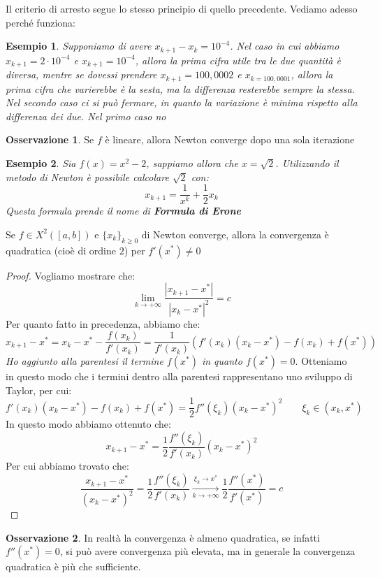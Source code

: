 \documentclass[11pt,a4paper,twoside]{article}
\newtheorem{es}{Esempio}
\theoremstyle{definition}
\newtheorem*{oss}{Osservazione}
\begin{document}
Il criterio di arresto segue lo stesso principio di quello precedente. Vediamo adesso perché funziona:

\begin{es}
	Supponiamo di avere $x_{k+1}-x_k = 10^{-4}$. Nel caso in cui abbiamo $x_{k+1} = 2\cdot 10^{-4}$ e $x_{k+1} = 10^{-4}$, allora la prima cifra utile tra le due quantità è diversa, mentre se dovessi prendere $x_{k+1} = 100,0002$ e $x_{k = 100,0001}$, allora la prima cifra che varierebbe è la sesta, ma la differenza resterebbe sempre la stessa. Nel secondo caso ci si può fermare, in quanto la variazione è minima rispetto alla differenza dei due. Nel primo caso no
\end{es}

\begin{oss}
	Se $f$ è lineare, allora Newton converge dopo una sola iterazione
\end{oss}

\begin{es}
	Sia $f(x) =x^2-2$, sappiamo allora che $x = \sqrt 2$. Utilizzando il metodo di Newton è possibile calcolare $\sqrt 2$ con:
	\[ x_{k+1}= \frac 1{x^k} + \frac 12 x_k \]
	Questa formula prende il nome di \textbf{Formula di Erone}
\end{es}

\begin{prop}{}{}
	Se $f \in X^2([a,b])$ e $\{x_k\}_{k \geq 0}$ di Newton converge, allora la convergenza è quadratica (cioè di ordine $2$) per $f'(x^*)\neq 0$
\end{prop}

\begin{proof}
	Vogliamo mostrare che:
	\[ \lim_{k\to +\infty} \frac{|x_{k+1} - x^*|}{|x_k - x^*|^2} = c \]
	Per quanto fatto in precedenza, abbiamo che:
	\[ x_{k+1}-x^* = x_k - x^* - \frac{f(x_k)}{f'(x_k)} = \frac 1{f'(x_k)}(f'(x_k)(x_k-x^*) - f(x_k) + f(x^*)) \]
	\textit{Ho aggiunto alla parentesi il termine $f(x^*)$ in quanto $f(x^*)=0$}. Otteniamo in questo modo che i termini dentro alla parentesi rappresentano uno sviluppo di Taylor, per cui:
	\[ f'(x_k)(x_k-x^*) - f(x_k) + f(x^*) = \frac 12 f''(\xi_k)(x_k - x^*)^2 \qquad \xi_k \in (x_k, x^*)\]
	In questo modo abbiamo ottenuto che:
	\[ x_{k+1} - x^* = \frac 12 \frac{f''(\xi_k)}{f'(x_k)} (x_k-x^*)^2 \]
	Per cui abbiamo trovato che:
	\[ \frac{x_{k+1} - x^*}{(x_k - x^*)^2} = \frac 12 \frac{f''(\xi_k)}{f'(x_k)} \xrightarrow[k \to +\infty]{\xi_k \to x^*} \frac 12 \frac{f''(x^*)}{f'(x^*)} = c\]
\end{proof}
\begin{oss}
	In realtà la convergenza è almeno quadratica, se infatti $f''(x^*) = 0$, si può avere convergenza più elevata, ma in generale la convergenza quadratica è più che sufficiente.
\end{oss}
\end{document}

